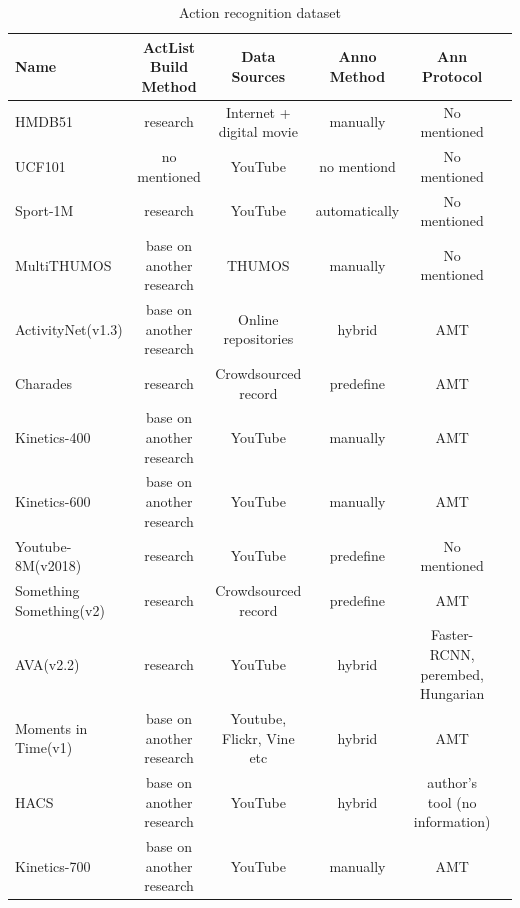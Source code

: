\documentclass[a4paper]{article}
\begin{document}
\begin{table}
	\centering
	\caption{Action recognition dataset}
	\renewcommand{\arraystretch}{1.5}
	\begin{tabular}{l|c|c|c|c|c}
		\toprule  
		Name                    & ActList Build Method     & Data Sources                    & Anno Method   & Ann Protocol  \\
		\hline
		HMDB51                  & research                 & Internet + digital movie        & manually      & No mentioned     \\
		UCF101                  & no mentioned             & YouTube                         & no mentiond   & No mentioned \\
		Sport-1M                & research                 & YouTube                         & automatically & No mentioned \\
		MultiTHUMOS             & base on another research & THUMOS                          & manually      & No mentioned \\
		ActivityNet(v1.3)       & base on another research & Online repositories             & hybrid        & AMT    \\ 
		Charades                & research                 & Crowdsourced record             & predefine     & AMT   \\
		Kinetics-400            & base on another research & YouTube                         & manually      & AMT\\
		Kinetics-600            & base on another research & YouTube                         & manually      & AMT\\
		Youtube-8M(v2018)       & research                 & YouTube                         & predefine     & No mentioned\\
		Something Something(v2) & research                 & Crowdsourced record             & predefine     & AMT\\
		AVA(v2.2)               & research                 & YouTube                         & hybrid        & Faster-RCNN, perembed, Hungarian\\
		Moments in Time(v1)     & base on another research & Youtube, Flickr, Vine etc       & hybrid        & AMT     \\
		HACS                    & base on another research & YouTube                         & hybrid        & author's tool (no information) \\
		Kinetics-700            & base on another research & YouTube                         & manually      & AMT  \\

\end{tabular}
\end{table}
\end{document}
